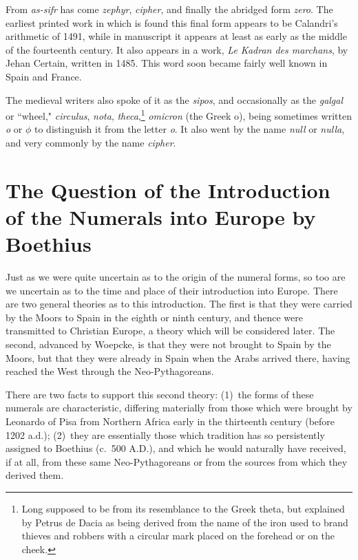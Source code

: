 \documentclass[11pt,a4paper]{article}
\begin{document}
From \textit{as-sifr} has come \textit{zephyr}, \textit{cipher}, and finally the abridged form \textit{zero}. The earliest printed work in which is found this final form appears to be Calandri's arithmetic of 1491, while in manuscript it appears at least as early as the middle of the fourteenth century. It also appears in a work, \textit{Le Kadran des marchans}, by Jehan Certain, written in 1485. This word soon became fairly well known in Spain and France.

The medieval writers also spoke of it as the \textit{sipos}, and occasionally as the \textit{galgal} or ``wheel," \textit{circulus}, \textit{nota}, \textit{theca},\footnote{Long supposed to be from its resemblance to the Greek theta, but explained by Petrus de Dacia as being derived from the name of the iron used to brand thieves and robbers with a circular mark placed on the forehead or on the cheek.} \textit{omicron} (the Greek o), being sometimes written \textit{o} or $\phi$ to distinguish it from the letter \textit{o}. It also went by the name \textit{null} or \textit{nulla}, and very commonly by the name \textit{cipher}.


\section{The Question of the Introduction of the Numerals into Europe by Boethius}

Just as we were quite uncertain as to the origin of the numeral forms, so too are we uncertain as to the time and place of their introduction into Europe. There are two general theories as to this introduction. The first is that they were carried by the Moors to Spain in the eighth or ninth century, and thence were transmitted to Christian Europe, a theory which will be considered later. The second, advanced by Woepcke, is that they were not brought to Spain by the Moors, but that they were already in Spain when the Arabs arrived there, having reached the West through the Neo-Pythagoreans.

There are two facts to support this second theory: (1)~the forms of these numerals are characteristic, differing materially from those which were brought by Leonardo of Pisa from Northern Africa early in the thirteenth century (before 1202 a.d.); (2)~they are essentially those which tradition has so persistently assigned to Boethius (c.~500 A.D.), and which he would naturally have received, if at all, from these same Neo-Pythagoreans or from the sources from which they derived them.
\end{document}
